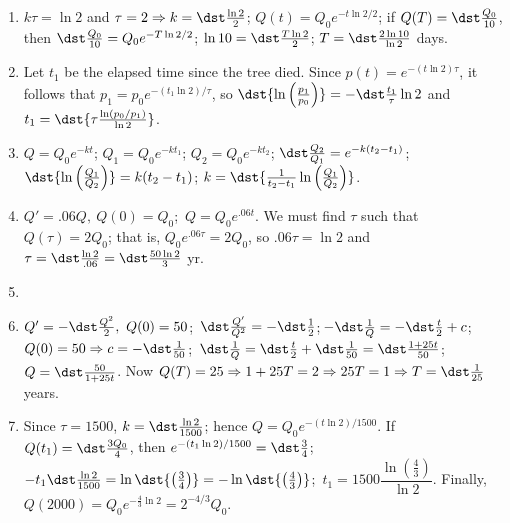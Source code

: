 \documentclass[openany]{book}
\newenvironment{sectionSolutions}{
 \begin{enumerate}[item-label={\thesection.\arabic{enumi}.}]
}{
 \end{enumerate}
}
\begin{document}
\begin{sectionSolutions}
\item
$k\tau=\ln2$ and $\tau=2\Rightarrow k=\dst\frac{\ln2}{2}$;
$Q(t)=Q_0e^{-t\ln2/2}$; if $Q(T)=\dst\frac{Q_0}{10}$, then
$\dst\frac{Q_0}{10}=Q_0e^{-T\ln2/2}$; $\ln10=\dst\frac{T\ln2}{2}$;
$T=\dst\frac{2\ln10}{\ln2}$ days.


\item
Let $t_1$ be the elapsed time since the tree died.
Since $p(t)=e^{-(t\ln2)\tau}$, it follows that
$p_1=p_0e^{-(t_1\ln2)/\tau}$, so $\dst{\ln\left(\frac{p_1}{ p_0}\right)}
=-\dst\frac{t_1}{\tau}\ln2$ and
 $t_1=\dst{\tau\frac{\ln(p_0/p_1)}{\ln2}}$.




\item
$Q=Q_0e^{-kt}$;
$Q_1=Q_0e^{-kt_1}$;
$Q_2=Q_0e^{-kt_2}$; $\dst\frac{Q_2}{ Q_1}=e^{-k(t_2-t_1)}$;
$\dst{\ln\left(\frac{Q_1}{ Q_2}\right)}=k(t_2-t_1)$; $k=\dst{\frac{1}{
t_2-t_1}\ln\left(\frac{Q_1}{ Q_2}\right)}$.


\item
$Q'=.06Q,\ Q(0)=Q_0$;\ $Q=Q_0e^{.06t}$. We must find $\tau$
such that $Q(\tau)=2Q_0$; that is, $Q_0e^{.06\tau}=2Q_0$, so
$.06\tau=\ln2$ and $\tau=\dst\frac{\ln2}{.06} =\dst\frac{50\ln2}{3}$ yr.


\item
{}

\item
$Q'=-\dst\frac{Q^2}{2},\ Q(0)=50$;\, $\dst\frac{Q'}{
Q^2}=-\dst\frac{1}{2}$;\,$-\dst\frac{1}{ Q}=-\dst\frac{t}{2}+c$;\,
$Q(0)=50\Rightarrow c=-\dst\frac{1}{50}$;\, $\dst\frac{1}{
Q}=\dst\frac{t}{2}+\dst\frac{1}{50}=\dst\frac{1+25t}{50}$;\,
$Q=\dst\frac{50}{1+25t}$. Now $Q(T)=25\Rightarrow1+25T=2\Rightarrow
25T=1\Rightarrow T=\dst\frac{1}{25}$ years.


\item
Since $\tau=1500$, $k=\dst\frac{\ln2}{1500}$; hence
$Q=Q_0e^{-(t\ln2)/1500}$. If $Q(t_1)=\dst\frac{3Q_0}{4}$, then
$e^{-(t_1\ln2)/1500}=\dst\frac{3}{4}$;\,
$-t_1\dst\frac{\ln2}{1500}=\ln\dst{\left(\frac{3}{4}\right)}=
-\ln\dst{\left(\frac{4}{3}\right)}$;\,
$t_1=1500\dfrac{\ln\left(\frac{4}{3}\right)}{\ln2}$. Finally,
$Q(2000)=Q_0e^{-\frac{4}{3}\ln2}=2^{-4/3}Q_0$.


\end{sectionSolutions}
\end{document}
